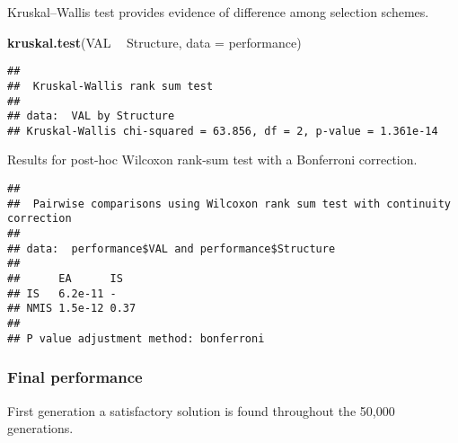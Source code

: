 \documentclass[]{book}
\newenvironment{Shaded}{\begin{snugshade}}{\end{snugshade}}
\newcommand{\DataTypeTok}[1]{\textcolor[rgb]{0.13,0.29,0.53}{#1}}
\newcommand{\KeywordTok}[1]{\textcolor[rgb]{0.13,0.29,0.53}{\textbf{#1}}}
\newcommand{\NormalTok}[1]{#1}
\newcommand{\OperatorTok}[1]{\textcolor[rgb]{0.81,0.36,0.00}{\textbf{#1}}}
\newcommand{\OtherTok}[1]{\textcolor[rgb]{0.56,0.35,0.01}{#1}}
\newcommand{\StringTok}[1]{\textcolor[rgb]{0.31,0.60,0.02}{#1}}
\begin{document}
Kruskal--Wallis test provides evidence of difference among selection schemes.

\begin{Shaded}
\begin{Highlighting}[]
\KeywordTok{kruskal.test}\NormalTok{(VAL }\OperatorTok{~}\StringTok{ }\NormalTok{Structure, }\DataTypeTok{data =}\NormalTok{ performance)}
\end{Highlighting}
\end{Shaded}

\begin{verbatim}
## 
##  Kruskal-Wallis rank sum test
## 
## data:  VAL by Structure
## Kruskal-Wallis chi-squared = 63.856, df = 2, p-value = 1.361e-14
\end{verbatim}

Results for post-hoc Wilcoxon rank-sum test with a Bonferroni correction.

\begin{Shaded}
\end{Shaded}

\begin{verbatim}
## 
##  Pairwise comparisons using Wilcoxon rank sum test with continuity correction 
## 
## data:  performance$VAL and performance$Structure 
## 
##      EA      IS  
## IS   6.2e-11 -   
## NMIS 1.5e-12 0.37
## 
## P value adjustment method: bonferroni
\end{verbatim}

\hypertarget{final-performance-10}{%
\subsubsection{Final performance}\label{final-performance-10}}

First generation a satisfactory solution is found throughout the 50,000 generations.
\end{document}
